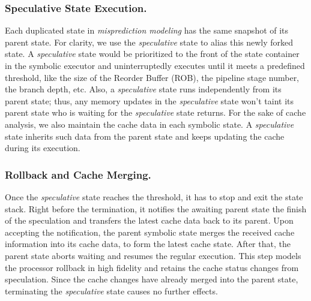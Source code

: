 \documentclass[sigconf,screen]{acmart}
\newcommand\ignore[1]{}
\begin{document}
\subsubsection{Speculative State Execution.}
Each duplicated state in \textit{misprediction modeling} has the same snapshot 
of its parent state. For clarity, we use the \textit{speculative} state to alias 
this newly forked state. A \textit{speculative} state would be prioritized to 
the front of the state container in the symbolic executor and uninterruptedly 
executes until it meets a predefined threshold, like the size of the Reorder 
Buffer (ROB), the pipeline stage number, the branch depth, etc. Also, a 
\textit{speculative} state runs independently from its parent state; thus, any 
memory updates in the \textit{speculative} state won't taint its parent state 
who is waiting for the \textit{speculative} state returns. For the sake of cache 
analysis, we also maintain the cache data in each symbolic state. A 
\textit{speculative} state inherits such data from the parent state and keeps 
updating the cache during its execution.


\subsubsection{Rollback and Cache Merging.}
Once the \textit{speculative} state reaches the threshold, it has to stop and 
exit the state stack. Right before the termination, it notifies the awaiting 
parent state the finish of the speculation and transfers the latest cache data 
back to its parent. Upon accepting the notification, the parent symbolic state 
merges the received cache information into its cache data, to form the latest 
cache state. After that, the parent state aborts waiting and resumes the regular 
execution. This step models the processor rollback in high fidelity and retains 
the cache status changes from speculation. Since the cache changes have already 
merged into the parent state, terminating the \textit{speculative} state causes 
no further effects.  


\ignore{
Our approach is natural to symbolic execution, while state-of-the-art simulation 
method~\cite{OleksenkoTSF19} requires sophisticated instrumentations and special 
instructions to enforce CPU behaviors. More modeling details of our approach would 
appear in Section~\ref{sec:spec_modeling}.
}

\ignore{ %
For the record, speculative execution is *not* just branch prediction. Branch 
prediction is just one type of speculative execution; processors also speculate 
on memory dependencies and reorder loads and stores (called memory disambiguation). 
Branch prediction is *not* inherently out-of-order, since early processors (and 
even some simple ones today) that were pipelined only did in fact do branch 
prediction but never reordered instructions. Superscalar execution, as the authors 
point out Tomasulo's algorithm (btw the citation here is somehow corrupted--please 
fix your bibtex) does in fact reorder instructions, but this is a whole new class 
of reorderings that is not captured in this paper, which leads into (2).
}
\end{document}
